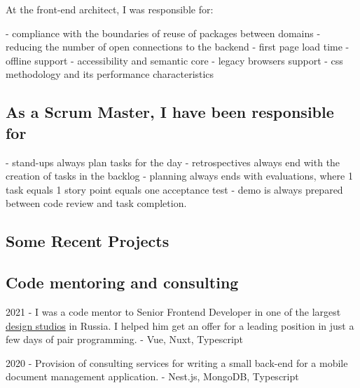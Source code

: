 \documentclass{yb}
\begin{document}
\begin{samepage}
At the front-end architect, I was responsible for:

 - compliance with the boundaries of reuse of packages between domains
\newline - reducing the number of open connections to the backend
\newline - first page load time
\newline - offline support
\newline - accessibility and semantic core
\newline - legacy browsers support
\newline - css methodology and its performance characteristics

\end{samepage}

\subsection*{As a Scrum Master, I have been responsible for}

 - stand-ups always plan tasks for the day
\newline - retrospectives always end with the creation of tasks in the backlog
\newline - planning always ends with evaluations, where 1 task equals 1 story point equals one acceptance test
\newline - demo is always prepared between code review and task completion.

\begin{samepage}

\subsection*{Some Recent Projects}

\subsection*{Code mentoring and consulting}

2021 - I was a code mentor to Senior Frontend Developer in one of the largest \href{https://pinkman.ru/}{design studios} in Russia. I helped him get an offer for a leading position in just a few days of pair programming.
\newline - Vue, Nuxt, Typescript

2020 - Provision of consulting services for writing a small back-end for a mobile document management application.
\newline - Nest.js, MongoDB, Typescript

\end{samepage}
\end{document}
